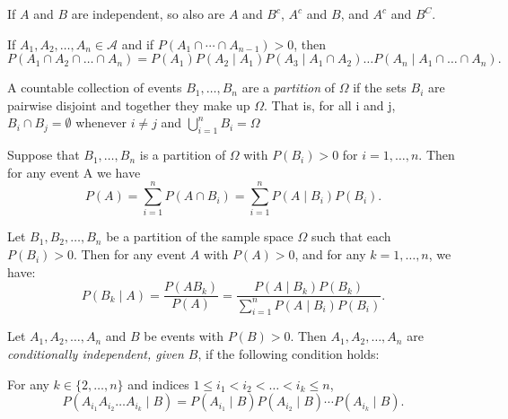 \documentclass[../main.tex]{subfiles}
\begin{document}
\begin{exercise}
If $A$ and $B$ are independent, so also are $A$ and $B^c$, $A^c$ and $B$, and $A^c$ and $B^C$. 
\end{exercise}

\begin{proposition}
If \(A_1, A_2, \dots, A_n \in \mathcal{A}\) and if $ P(A_1 \cap \cdots \cap A_{n-1}) > 0$, then  
\[
P(A_1 \cap A_2 \cap \dots \cap A_n) = P(A_1)P(A_2 \mid A_1)P(A_3 \mid A_1 \cap A_2) \dots P(A_n \mid A_1 \cap \dots \cap A_n).
\]
\end{proposition}


\begin{definition}
A countable collection of events \(B_1, \dots, B_n\) are a \textit{partition} of \(\Omega\) 
if the sets \(B_i\) are pairwise disjoint and together they make up \(\Omega\). 
That is, for all i and j, \( B_i \cap B_j = \emptyset \) whenever \(i \neq j\) 
and \( \bigcup_{i=1}^n B_i = \Omega\)
\end{definition}

\begin{proposition}
    Suppose that \(B_1, \dots, B_n\) is a partition of \(\Omega\) with \(P(B_i) > 0\) for \(i = 1, \dots, n.\) Then for any event A we have
    \[
    P(A) = \sum_{i=1}^n P(A \cap B_i) = \sum_{i=1}^n P(A \mid B_i)P(B_i).
    \]
    
\end{proposition}


\begin{theorem}\label{thm:bayes_formula}
Let \( B_1, B_2, \dots, B_n \) be a partition of the sample space \( \Omega \) such that each \( P(B_i) > 0 \). Then for any event \( A \) with \( P(A) > 0 \), and for any \( k = 1, \dots, n \), we have:
\[
P(B_k \mid A) = \frac{P(A B_k)}{P(A)} = \frac{P(A \mid B_k) P(B_k)}{\sum_{i=1}^{n} P(A \mid B_i) P(B_i)}.
\]
\end{theorem}





\begin{definition}\label{def:conditional_independence}
Let \( A_1, A_2, \dots, A_n \) and \( B \) be events with \( P(B) > 0 \). Then \( A_1, A_2, \dots, A_n \) are \textit{conditionally independent, given \( B \)}, if the following condition holds:

For any \( k \in \{2, \dots, n\} \) and indices \( 1 \leq i_1 < i_2 < \dots < i_k \leq n \),
\[
P(A_{i_1} A_{i_2} \dots A_{i_k} \mid B) = P(A_{i_1} \mid B) P(A_{i_2} \mid B) \cdots P(A_{i_k} \mid B).
\]
\end{definition}
\end{document}
